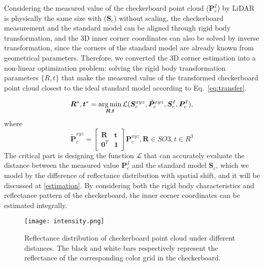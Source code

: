 \documentclass[journal]{vgtc}
\DeclareMathOperator*{\argmin}{arg\,min}
\begin{document}
Considering the measured value of the checkerboard point cloud ($\bm P^I_c$) by LiDAR is physically the same size with ($\bm S_c$) without scaling, the checkerboard measurement and the standard model can be aligned through rigid body transformation, and the 3D inner corner coordinates can also be solved by inverse transformation, since the corners of the standard model are already known from geometrical parameters. Therefore, we converted the 3D corner estimation into a non-linear optimization problem: solving the rigid body transformation parameters $\{R,t\}$ that make the measured value of the transformed checkerboard point cloud closest to the ideal standard model according to Eq.~\ref{eq:transfer}.

\begin{equation}
	\label{eq:transfer}
	\centering
	\bm R^*, \bm t^* =
	\argmin_{\bm R,\bm t} 
	\mathcal{L}
	(
	\bm S^{xyz}_c,
	\tilde {\bm P}^{xyz}_c,
	\bm S^{I}_c,
	\bm P^{I}_c
	),
\end{equation}
where
\begin{equation}
	\label{eq:transfer_exp}
	\tilde {\bm P}^{xyz}_c 
	=
	\left [
		\begin{matrix}
			\bm R   & \bm t \\
			\bm 0^T & \bm 1 
		\end{matrix}
	\right]
	\bm P^{xyz}_c,
	\bm R \in SO3, t \in R^3
\end{equation}
The critical part is designing the function $\mathcal{L}$ that can accurately evaluate the distance between the measured value $\bm P^I_c$ and the standard model $\bm S_c$, which we model by the difference of reflectance distribution with spatial shift, and it will be discussed at \ref{estimation}. By considering both the rigid body characteristics and reflectance pattern of the checkerboard, the inner corner coordinates can be estimated integrally. 



\begin{figure}
	\centering
	\texttt{[image: intensity.png]} 
	\caption{Reflectance distribution of checkerboard point cloud under different distances. The black and white bars respectively represent the reflectance of the corresponding color grid in the checkerboard.}
	\label{fig:intensitydis} 
	
\end{figure}
\end{document}
